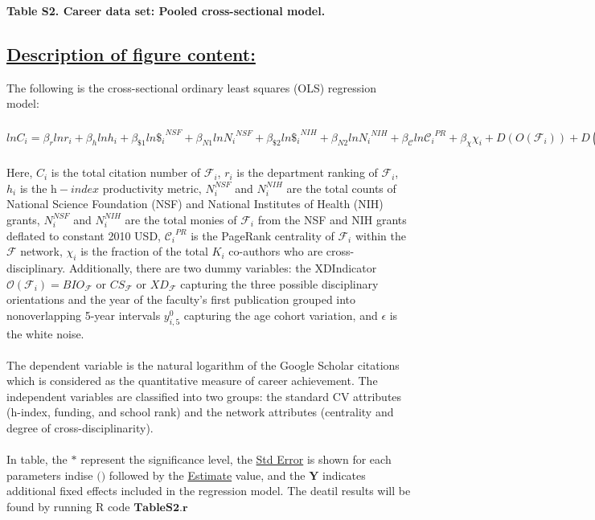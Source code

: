 \documentclass{article}\usepackage[]{graphicx}\usepackage[]{color}
\begin{document}
\begin{center}
\par{\textbf{Table S2. Career data set: Pooled cross-sectional model.}}
\end{center}
\subsection*{\underline{Description of figure content:}}
\par{
The following is the cross-sectional ordinary least squares (OLS) regression model:
\\\\ $lnC_i = {{\beta}_r}ln{r_i} + {{\beta}_h}ln{h_i} + {{\beta}_{\$1}}ln{{\$_i}^{NSF}} + {{\beta}_{N1}}ln{{N_i}^{NSF}} + {{\beta}_{\$2}}ln{{\$_i}^{NIH}} + {{\beta}_{N2}}ln{{N_i}^{NIH}} + {{\beta}_{\mathscr{C}}}ln{{\mathscr{C}_i}^{PR}} + {{\beta}_{\chi}}{{\chi}_i} + D(O(\mathcal{F}_i)) + D(y_{i,5}^0) + {\beta}_o + \epsilon $ \\\\
Here, $C_i$ is the total citation number of $\mathcal{F}_i$, $r_i$ is the department ranking of $\mathcal{F}_i$, $h_i$ is the $\textit{h}-index$ productivity metric, $N_i^{NSF}$ and $N_i^{NIH}$ are the total counts of National Science Foundation (NSF) and National Institutes of Health (NIH) grants, $N_i^{NSF}$ and $N_i^{NIH}$ are the total monies of $\mathcal{F}_i$ from the NSF and NIH grants deflated to constant 2010 USD, ${\mathscr{C}_i}^{PR}$ is the PageRank centrality of $\mathcal{F}_i$ within the $\mathcal{F}$ network, $\chi_i$ is the fraction of the total $K_i$ co-authors who are cross-disciplinary. Additionally, there are two dummy variables: the XDIndicator $\mathscr{O}(\mathcal{F}_i) = BIO_\mathcal{F}$ or $CS_\mathcal{F}$ or $XD_\mathcal{F}$ capturing the three possible disciplinary orientations and the year of the faculty’s first publication grouped into nonoverlapping 5-year intervals $y_{i,5}^0$ capturing the age cohort variation, and $\epsilon$ is the white noise. \\\\
The dependent variable is the natural logarithm of the Google Scholar citations which is considered as the quantitative measure of career achievement. The independent variables are classified into two groups: the standard CV attributes (h-index, funding, and school rank) and the network attributes (centrality and degree of cross-disciplinarity). \\\\
In table, the $\textbf{*}$ represent the significance level, the \underline{Std Error} is shown for each parameters indise $\textbf{()}$ followed by the \underline{Estimate} value, and the $\textbf{Y}$ indicates additional fixed effects included in the regression model. The deatil results will be found by running R code $\textbf{TableS2.r}$
}
\end{document}
